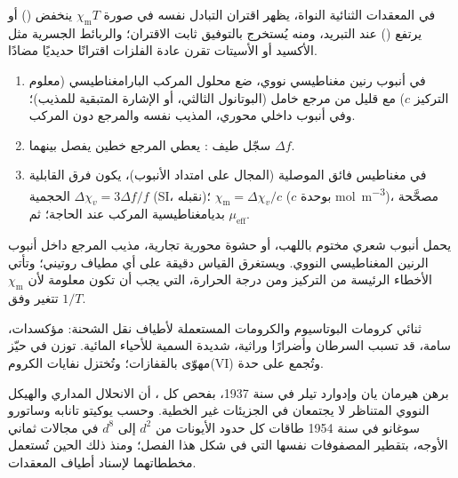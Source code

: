 في المعقدات الثنائية النواة، يظهر اقتران التبادل نفسه في صورة $\chi_{\mathrm m}T$ ينخفض
() أو يرتفع () عند التبريد، ومنه يُستخرج بالتوفيق ثابت
الاقتران؛ والربائط الجسرية مثل الأكسيد أو الأسيتات تقرن عادة
الفلزات اقترانًا حديديًا مضادًا.

\begin{method}\label{met:b3:complex-spectra-magnetism:evans}
\begin{enumerate}
  \item في أنبوب رنين مغناطيسي نووي، ضع محلول المركب البارامغناطيسي (معلوم
        التركيز $c$) مع قليل من مرجع خامل (البوتانول الثالثي، أو الإشارة
        المتبقية للمذيب)؛ وفي أنبوب داخلي محوري، المذيب نفسه 
        والمرجع دون المركب.
  \item سجّل طيف : يعطي المرجع خطين يفصل بينهما $\Delta f$.
  \item في مغناطيس فائق الموصلية (المجال على امتداد الأنبوب)، يكون فرق القابلية
        الحجمية $\Delta\chi_v = 3\Delta f/f$ (SI، نقبله)؛ $\chi_{\mathrm m} = \Delta\chi_v/c$ ($c$ بوحدة
        \unit{mol.m^{-3}})، مصحَّحة بديامغناطيسية المركب عند الحاجة؛
        ثم $\mu_{\mathrm{eff}}$.
\end{enumerate}
\end{method}

\begin{inthelab}
يحمل أنبوب شعري مختوم باللهب، أو حشوة محورية تجارية، مذيب المرجع
داخل أنبوب الرنين المغناطيسي النووي. ويستغرق القياس دقيقة على أي
مطياف روتيني؛ وتأتي الأخطاء الرئيسة من التركيز ومن
درجة الحرارة، التي يجب أن تكون معلومة لأن $\chi_{\mathrm m}$ تتغير وفق $1/T$.
\end{inthelab}

\begin{safety}{}
ثنائي كرومات البوتاسيوم والكرومات المستعملة لأطياف نقل الشحنة:
مؤكسدات، سامة، قد تسبب السرطان وأضرارًا وراثية، شديدة السمية
للأحياء المائية. توزن في حيّز مهوّى بالقفازات؛ وتُختزل نفايات الكروم(VI)
وتُجمع على حدة.
\end{safety}

\begin{history}
برهن هيرمان يان وإدوارد تيلر في سنة 1937، بفحص كل ،
أن الانحلال المداري والهيكل النووي المتناظر لا يجتمعان في
الجزيئات غير الخطية. وحسب يوكيتو تانابه وساتورو سوغانو في سنة 1954
طاقات كل حدود الأيونات من $d^2$ إلى $d^8$ في مجالات ثماني الأوجه،
بتقطير المصفوفات نفسها التي في شكل هذا الفصل؛ ومنذ ذلك الحين
تُستعمل مخططاتهما لإسناد أطياف المعقدات.
\end{history}


